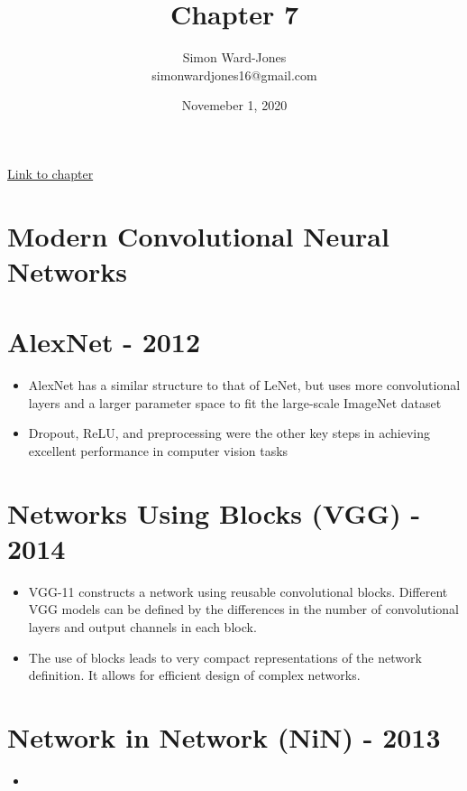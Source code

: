 \documentclass[12pt,notitlepage]{article}
\begin{document}


\title{\Large{\textbf{Chapter 7}}}
\date{Novemeber 1, 2020}
\author{Simon Ward-Jones\\simonwardjones16@gmail.com}

\maketitle
\href{https://d2l.ai/chapter_convolutional-modern/index.html}{Link to chapter}

\section{Modern Convolutional Neural Networks}

\section{AlexNet - 2012}
\begin{itemize}
  \item AlexNet has a similar structure to that of LeNet, but uses more convolutional layers and a larger parameter space to fit the large-scale ImageNet dataset
  \item Dropout, ReLU, and preprocessing were the other key steps in achieving excellent performance in computer vision tasks
\end{itemize}

\section{ Networks Using Blocks (VGG) - 2014 }
\begin{itemize}
  \item VGG-11 constructs a network using reusable convolutional blocks. Different VGG models can be defined by the differences in the number of convolutional layers and output channels in each block.
  \item The use of blocks leads to very compact representations of the network definition. It allows for efficient design of complex networks.
\end{itemize}

\section{ Network in Network (NiN) - 2013 }
\begin{itemize}
  \item 
\end{itemize}



\vfill

\nocite{zhang2020dive}
\end{document}
